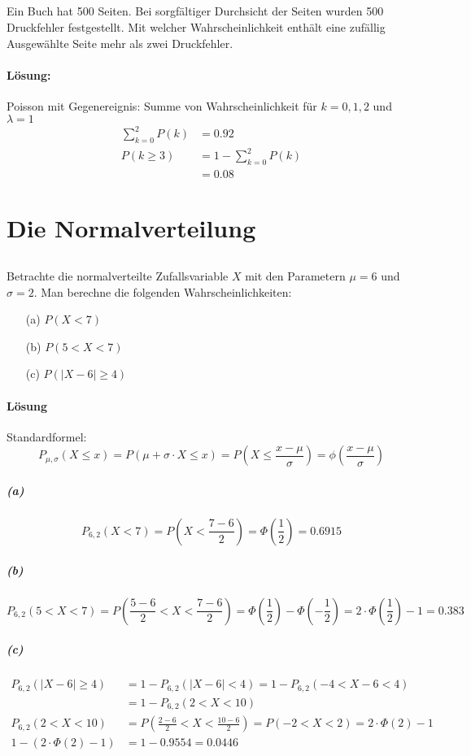 \documentclass[ngerman]{scrartcl}
\begin{document}
\subsection{}
Ein Buch hat 500 Seiten. Bei sorgfältiger Durchsicht der Seiten wurden 500 Druckfehler festgestellt. Mit welcher Wahrscheinlichkeit enthält eine zufällig Ausgewählte Seite mehr als zwei Druckfehler.
\paragraph{Lösung:}
Poisson mit Gegenereignis: Summe von Wahrscheinlichkeit für $k=0,1,2$ und $\lambda=1$
\begin{align*}
\sum_{k=0}^2{P(k)} &= 0.92 \\
P(k\geq 3) &= 1 - \sum_{k=0}^2{P(k)} \\
&= 0.08
\end{align*}

\section{Die Normalverteilung}
\subsection{}
Betrachte die normalverteilte Zufallsvariable $X$ mit den Parametern $\mu = 6$ und $\sigma=2$. Man berechne die folgenden Wahrscheinlichkeiten:
\begin{enumerate}
\item[(a)] $P(X<7)$
\item[(b)] $P(5<X<7)$
\item[(c)] $P(|X-6| \geq 4)$
\end{enumerate}
\paragraph{Lösung}
Standardformel:
\begin{equation}
P_{\mu,\sigma}(X \leq x) = P\left(\mu+\sigma\cdot X \leq x\right) = P\left(X \leq \frac{x - \mu}{\sigma}\right) = \phi\left(\frac{x - \mu}{\sigma}\right)
\end{equation}
\subparagraph{(a)}
\begin{equation}
P_{6,2}(X<7) = P\left(X < \frac{7 - 6}{2}\right) = \Phi\left(\frac{1}{2}\right) = 0.6915
\end{equation}
\subparagraph{(b)}
\begin{equation}
P_{6,2}(5<X<7) = P\left(\frac{5 - 6}{2} < X < \frac{7 - 6}{2}\right) = \Phi\left( \frac{1}{2}\right) - \Phi\left(- \frac{1}{2}\right) = 2\cdot\Phi\left( \frac{1}{2}\right) - 1 = 0.383
\end{equation}
\subparagraph{(c)}
\begin{align*}
P_{6,2}(|X-6| \geq 4) &= 1 - P_{6,2}(|X-6| < 4) = 1 - P_{6,2}(-4 < X-6 <4) \\
&= 1 - P_{6,2}(2 < X < 10)\\
P_{6,2}(2 < X < 10) &= P\left(\frac{2 - 6}{2} < X < \frac{10 - 6}{2}\right) = P(-2 < X < 2) = 2\cdot \Phi(2) - 1\\
1 - \left(2\cdot \Phi(2) - 1 \right) &= 1 - 0.9554 = 0.0446
\end{align*}
\end{document}
